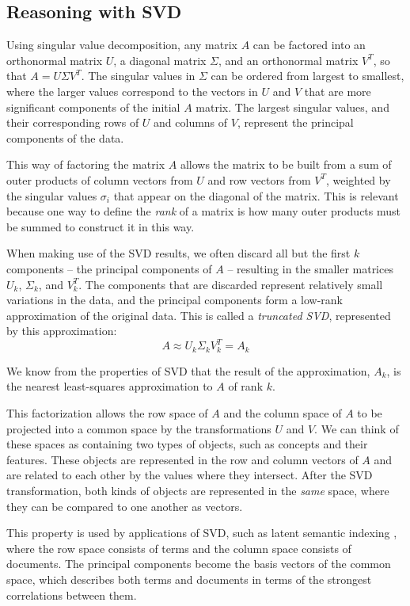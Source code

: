 \documentclass[11pt]{article}
\begin{document}
\subsection{Reasoning with SVD}

Using singular value decomposition, any matrix $A$ can be factored into an
orthonormal matrix $U$, a diagonal matrix $\Sigma$, and an orthonormal matrix
$V^T$, so that  $A = U\Sigma V^T$. The singular
values in $\Sigma$ can be ordered from largest to smallest, where the larger
values correspond to the vectors in $U$ and $V$ that are more significant
components of the initial $A$ matrix. The largest singular values, and their
corresponding rows of $U$ and columns of $V$, represent the principal
components of the data.

This way of factoring the matrix $A$ allows the matrix to be built from a sum
of outer products of column vectors from $U$ and row vectors from $V^T$,
weighted by the singular values $\sigma_i$ that appear on the diagonal of the
matrix. This is relevant because one way to define the {\em rank} of a matrix
is how many outer products must be summed to construct it in this way.

When making use of the SVD results, we often discard all but the first $k$
components -- the principal components of $A$ -- resulting in the smaller
matrices $U_k$, $\Sigma_k$, and $V^T_k$. The
components that are discarded represent relatively small variations in the
data, and the principal components form a low-rank approximation of the
original data. This is called a {\em truncated SVD}, represented by this
approximation: $$A \approx U_k\Sigma_k V^T_k = A_k$$

We know from the properties of SVD that the result of the approximation, $A_k$, is the nearest least-squares approximation to $A$ of rank $k$.

This factorization allows the row space of $A$ and the column space of $A$ to be projected into a common space by the transformations $U$ and $V$.
We can think of these spaces as containing two types of objects, such as
concepts and their features. These objects are represented
in the row and column vectors of $A$ and are related to each other by
the values where they intersect. After the SVD transformation, both kinds of
objects are represented in the {\em same} space, where they can be compared to
one another as vectors.

This property is used by applications of SVD, such as latent semantic indexing
\cite{lsa}, where the row space consists of terms and the column space consists
of documents. The principal components become the basis vectors of the common
space, which describes both terms and documents in terms of the strongest
correlations between them.
\end{document}
